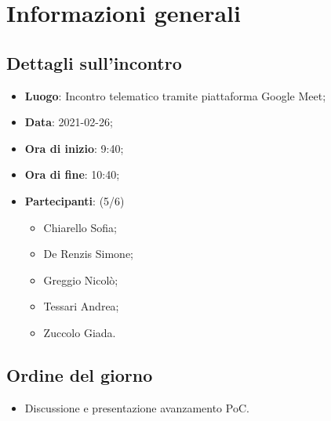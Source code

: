 \section{Informazioni generali}

\subsection{Dettagli sull'incontro}
\begin{itemize}
\item \textbf{Luogo}: Incontro telematico tramite piattaforma Google Meet;
\item \textbf{Data}: 2021-02-26;
\item \textbf{Ora di inizio}: 9:40;
\item \textbf{Ora di fine}: 10:40;
\item \textbf{Partecipanti}: (5/6)
\begin{itemize}
	\item Chiarello Sofia;
    \item De Renzis Simone;
    \item Greggio Nicolò;
    \item Tessari Andrea;
    \item Zuccolo Giada.
\end{itemize}
\end{itemize}

\subsection{Ordine del giorno}
\begin{itemize}
	\item Discussione e presentazione avanzamento PoC.
\end{itemize}


